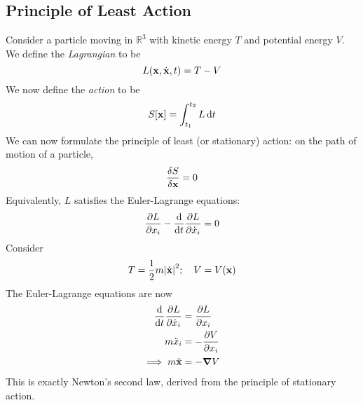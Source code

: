 \subsection{Principle of Least Action}
Consider a particle moving in \( \mathbb R^3 \) with kinetic energy \( T \) and potential energy \( V \).
We define the \textit{Lagrangian} to be
\[
	L(\vb x, \dot {\vb x}, t) = T - V
\]
We now define the \textit{action} to be
\[
	S[\vb x] = \int_{t_1}^{t_2} L \dd{t}
\]
We can now formulate the principle of least (or stationary) action: on the path of motion of a particle,
\[
	\fdv{S}{\vb x} = 0
\]
Equivalently, \( L \) satisfies the Euler-Lagrange equations:
\[
	\pdv{L}{x_i} - \dv{t}\pdv{L}{\dot x_i} = 0
\]
Consider
\[
	T = \frac{1}{2}m\abs{\dot{\vb x}}^2;\quad V = V(\vb x)
\]
The Euler-Lagrange equations are now
\begin{align*}
	\dv{t}\pdv{L}{\dot x_i} & = \pdv{L}{x_i}  \\
	m \ddot x_i             & = -\pdv{V}{x_i} \\
	\implies m \ddot{\vb x} & = -\grad V
\end{align*}
This is exactly Newton's second law, derived from the principle of stationary action.
